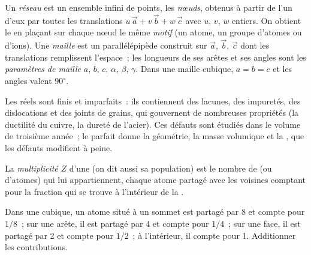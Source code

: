 \begin{definition}\label{def:b1:crystals-metals:lattice}
Un \emph{réseau} est un ensemble infini de points, les
\emph{nœuds}, obtenus à partir de l'un d'eux par toutes les
translations $u\,\vec a + v\,\vec b + w\,\vec c$ avec $u$, $v$, $w$
entiers. On obtient le  en plaçant sur chaque nœud le même
\emph{motif} (un atome, un groupe d'atomes ou d'ions). Une
\emph{maille} est un parallélépipède construit sur
$\vec a$, $\vec b$, $\vec c$ dont les translations remplissent
l'espace~; les longueurs de ses arêtes et ses angles sont les
\emph{paramètres de maille}
$a$, $b$, $c$, $\alpha$, $\beta$, $\gamma$. Dans une maille cubique,
$a = b = c$ et les angles valent $90^\circ$.
\end{definition}

\begin{remark}\label{rem:b1:crystals-metals:real}
Les  réels sont finis et imparfaits~: ils contiennent des
lacunes, des impuretés, des dislocations et des joints de grains, qui
gouvernent de nombreuses propriétés (la ductilité du cuivre, la dureté
de l'acier). Ces défauts sont étudiés dans le volume de troisième
année~; le  parfait donne la géométrie, la masse volumique et la
, que les défauts modifient à peine.
\end{remark}

\begin{definition}\label{def:b1:crystals-metals:multiplicity}
La \emph{multiplicité} $Z$ d'une  (on dit aussi sa
population) est le nombre de  (ou d'atomes) qui lui appartiennent,
chaque atome partagé avec les  voisines comptant pour la fraction
qui se trouve à l'intérieur de la .
\end{definition}

\begin{method}\label{met:b1:crystals-metals:count}
Dans une  cubique, un atome situé à un sommet est partagé par 8
 et compte pour $1/8$~; sur une arête, il est partagé par 4 et
compte pour $1/4$~; sur une face, il est partagé par 2 et compte pour
$1/2$~; à l'intérieur, il compte pour 1. Additionner les contributions.
\end{method}

